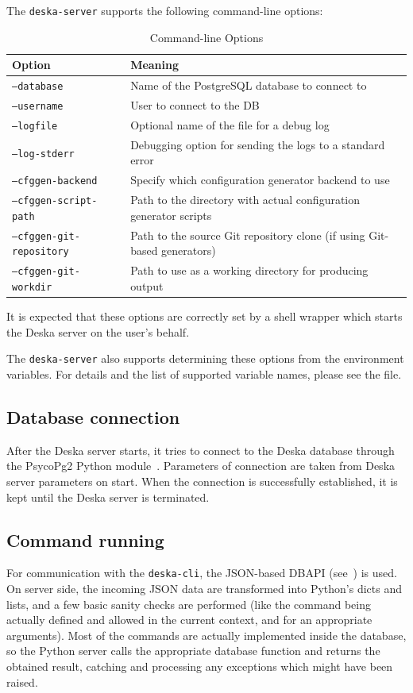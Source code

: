 \documentclass[deska]{subfiles}
\begin{document}
The {\tt deska-server} supports the following command-line options:

\begin{longtable}{ l | l }
    \caption{Command-line Options} \\
    Option & Meaning \\
    \hline
    \endhead
    {\tt --database} & Name of the PostgreSQL database to connect to \\
    {\tt --username} & User to connect to the DB \\
    {\tt --logfile} & Optional name of the file for a debug log \\
    {\tt --log-stderr} & Debugging option for sending the logs to a standard error \\
    {\tt --cfggen-backend} & Specify which configuration generator backend to use \\
    {\tt --cfggen-script-path} & Path to the directory with actual configuration generator scripts \\
    {\tt --cfggen-git-repository} & Path to the source Git repository clone (if using Git-based generators) \\
    {\tt --cfggen-git-workdir} & Path to use as a working directory for producing output \\
\end{longtable}

It is expected that these options are correctly set by a shell wrapper which starts the Deska server on the user's
behalf.

The {\tt deska-server} also supports determining these options from the environment variables.  For details and the list
of supported variable names, please see the  file.

\subsection{Database connection}
After the Deska server starts, it tries to connect to the Deska database through the PsycoPg2 Python
module~\cite{psycopg}.  Parameters of connection are taken from Deska server parameters on start.  When the connection
is successfully established, it is kept until the Deska server is terminated.

\subsection{Command running}
For communication with the {\tt deska-cli}, the JSON-based DBAPI (see~) is used. On server
side, the incoming JSON data are transformed into Python's dicts and lists, and a few basic sanity checks are performed
(like the command being actually defined and allowed in the current context, and for an appropriate arguments).  Most of
the commands are actually implemented inside the database, so the Python server calls the appropriate database function
and returns the obtained result, catching and processing any exceptions which might have been raised.
\end{document}
